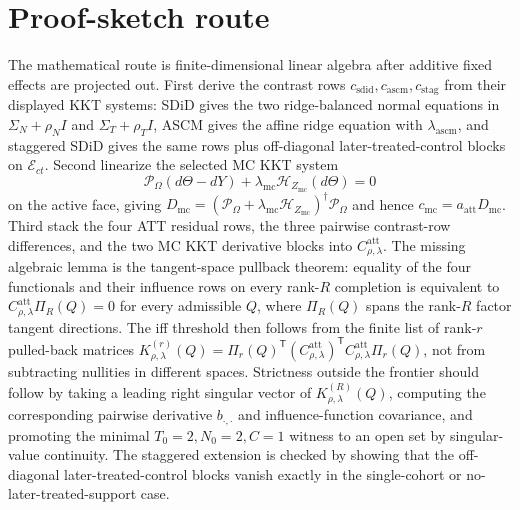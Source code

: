 \documentclass[11pt]{article}
\newcommand{\transpose}{\mathsf{T}}
\theoremstyle{definition}
\theoremstyle{plain}
\theoremstyle{remark}
\begin{document}
\section{Proof-sketch route}
The mathematical route is finite-dimensional linear algebra after additive fixed effects are projected out.  First derive the contrast rows \(c_{\mathrm{sdid}},c_{\mathrm{ascm}},c_{\mathrm{stag}}\) from their displayed KKT systems: SDiD gives the two ridge-balanced normal equations in \(\Sigma_N+\rho_N I\) and \(\Sigma_T+\rho_T I\), ASCM gives the affine ridge equation with \(\lambda_{\mathrm{ascm}}\), and staggered SDiD gives the same rows plus off-diagonal later-treated-control blocks on \(\mathcal E_{ct}\).  Second linearize the selected MC KKT system
\[
\mathcal P_\Omega(d\Theta-dY)+\lambda_{\mathrm{mc}}\mathcal H_{Z_{\mathrm{mc}}}(d\Theta)=0
\]
on the active face, giving \(D_{\mathrm{mc}}=(\mathcal P_\Omega+\lambda_{\mathrm{mc}}\mathcal H_{Z_{\mathrm{mc}}})^\dagger\mathcal P_\Omega\) and hence \(c_{\mathrm{mc}}=a_{\mathrm{att}}D_{\mathrm{mc}}\).  Third stack the four ATT residual rows, the three pairwise contrast-row differences, and the two MC KKT derivative blocks into \(C^{\mathrm{att}}_{\rho,\lambda}\).  The missing algebraic lemma is the tangent-space pullback theorem: equality of the four functionals and their influence rows on every rank-\(R\) completion is equivalent to \(C^{\mathrm{att}}_{\rho,\lambda}\Pi_R(Q)=0\) for every admissible \(Q\), where \(\Pi_R(Q)\) spans the rank-\(R\) factor tangent directions.  The iff threshold then follows from the finite list of rank-\(r\) pulled-back matrices \(K^{(r)}_{\rho,\lambda}(Q)=\Pi_r(Q)^\transpose(C^{\mathrm{att}}_{\rho,\lambda})^\transpose C^{\mathrm{att}}_{\rho,\lambda}\Pi_r(Q)\), not from subtracting nullities in different spaces.  Strictness outside the frontier should follow by taking a leading right singular vector of \(K^{(R)}_{\rho,\lambda}(Q)\), computing the corresponding pairwise derivative \(b_{\cdot,\cdot}\) and influence-function covariance, and promoting the minimal \(T_0=2,N_0=2,C=1\) witness to an open set by singular-value continuity.  The staggered extension is checked by showing that the off-diagonal later-treated-control blocks vanish exactly in the single-cohort or no-later-treated-support case.
\end{document}
